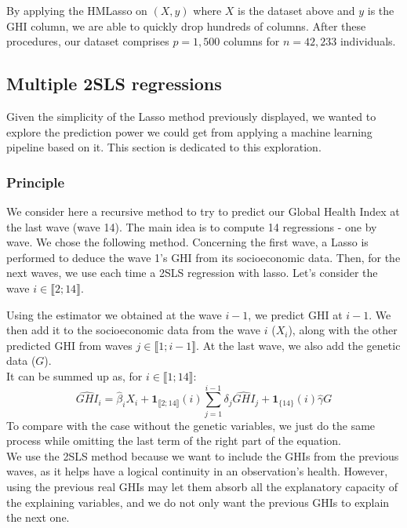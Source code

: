 \documentclass[]{article}
\begin{document}
By applying the HMLasso on $(X, y)$ where $X$ is the dataset above and $y$ is the GHI column, we are able to quickly drop hundreds of columns. After these procedures, our dataset comprises $p=1,500$ columns for $n=42,233$ individuals.

\subsection{Multiple 2SLS regressions}
\label{multiple2sls}
Given the simplicity of the Lasso method previously displayed, we wanted to explore the prediction power we could get from applying a machine learning pipeline based on it. This section is dedicated to this exploration.
\subsubsection{Principle}
We consider here a recursive method to try to predict our Global Health Index at the last wave (wave 14). The main idea is to compute 14 regressions - one by wave. We chose the following method. Concerning the first wave, a Lasso is performed to deduce the wave 1's GHI from its socioeconomic data. Then, for the next waves, we use each time a 2SLS regression with lasso. Let's consider the wave $i \in \llbracket 2; 14 \rrbracket$.

\noindent
Using the estimator we obtained at the wave $i-1$, we predict GHI at $i-1$. We then add it to the socioeconomic data from the wave $i$ ($X_i$), along with the other predicted GHI from waves $j \in \llbracket 1; i-1 \rrbracket$. At the last wave, we also add the genetic data ($G$).\\
It can be summed up as, for $i \in \llbracket 1; 14 \rrbracket$:
\begin{equation}
	\widehat{GHI}_i = \widehat{\beta}_{i}X_i + \textbf{1}_{\llbracket 2; 14 \rrbracket}(i) \sum_{j=1}^{i-1}{\delta_j}\widehat{GHI}_j + \textbf{1}_{\{ 14 \} }(i) \hat{\gamma} G
\end{equation}
To compare with the case without the genetic variables, we just do the same process while omitting the last term of the right part of the equation.\\
We use the 2SLS method because we want to include the GHIs from the previous waves, as it helps have a logical continuity in an observation's health. However, using the previous real GHIs may let them absorb all the explanatory capacity of the explaining variables, and we do not only want the previous GHIs to explain the next one.\\
\end{document}
